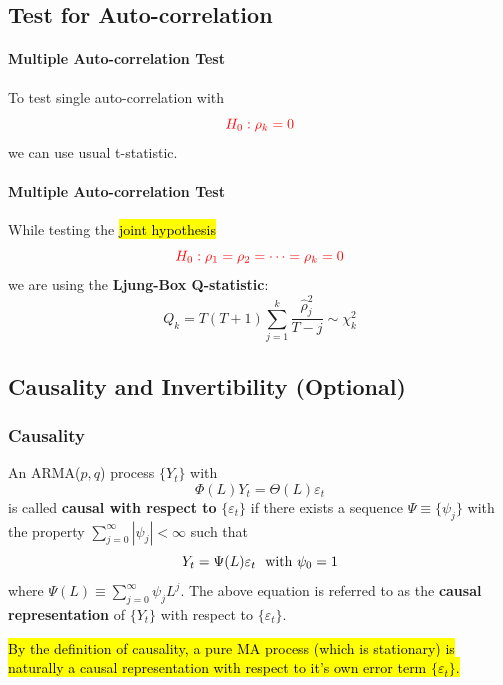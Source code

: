 \documentclass[11pt]{article}
\begin{document}
	\subsection{Test for Auto-correlation}
		\paragraph{Multiple Auto-correlation Test}To test single auto-correlation with 
			\begin{equation}
				\textcolor{red}{H_0: \rho_k = 0}
			\end{equation}
			we can use usual t-statistic.
		\paragraph{Multiple Auto-correlation Test}While testing the \hl{joint hypothesis}
		\begin{equation}
			\textcolor{red}{H_0: \rho_1 = \rho_2 = \dots = \rho_k = 0}
		\end{equation}
		we are using the \textbf{Ljung-Box Q-statistic}:
		\begin{equation}
			Q_k = T(T+1) \sum_{j=1}^k \frac{\hat{\rho}_j^2}{T-j} \sim \chi_k^2
		\end{equation}
	\subsection{Causality and Invertibility (Optional)}
	\subsubsection{Causality}
		\begin{definition}[Causality]
			An ARMA($p, q$) process $\{Y_t\}$ with 
			\begin{equation}
				\Phi(L)Y_t = \Theta(L)\varepsilon_t
			\end{equation}
			is called \textbf{causal with respect to} $\{\varepsilon_t\}$ if there exists a sequence $\Psi \equiv \{\psi_j\}$ with the property $\sum_{j=0}^\infty |\psi_j| < \infty$ such that 
			\begin{equation}
				Y_t = \Psi(L) \varepsilon_t\ \text{{ with }} \psi_0 = 1
			\end{equation}
			where $\Psi(L) \equiv \sum_{j=0}^\infty \psi_j L^j$. The above equation is referred to as the \textbf{causal representation} of $\{Y_t\}$ with respect to $\{\varepsilon_t\}$.
		\end{definition}
		
		\begin{proposition}
			\hl{By the definition of causality, a pure MA process (which is stationary) is naturally a causal representation with respect to it's own error term $\{\varepsilon_t\}$.}
		\end{proposition}
		
\end{document}
